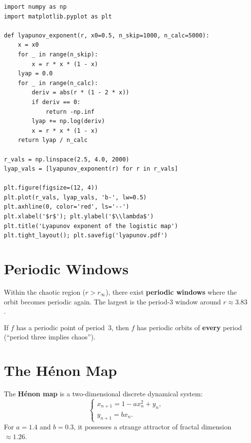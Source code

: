 \begin{codeblock}[title=\textbf{Computing the Lyapunov exponent}]
\begin{verbatim}
import numpy as np
import matplotlib.pyplot as plt

def lyapunov_exponent(r, x0=0.5, n_skip=1000, n_calc=5000):
    x = x0
    for _ in range(n_skip):
        x = r * x * (1 - x)
    lyap = 0.0
    for _ in range(n_calc):
        deriv = abs(r * (1 - 2 * x))
        if deriv == 0:
            return -np.inf
        lyap += np.log(deriv)
        x = r * x * (1 - x)
    return lyap / n_calc

r_vals = np.linspace(2.5, 4.0, 2000)
lyap_vals = [lyapunov_exponent(r) for r in r_vals]

plt.figure(figsize=(12, 4))
plt.plot(r_vals, lyap_vals, 'b-', lw=0.5)
plt.axhline(0, color='red', ls='--')
plt.xlabel('$r$'); plt.ylabel('$\\lambda$')
plt.title('Lyapunov exponent of the logistic map')
plt.tight_layout(); plt.savefig('lyapunov.pdf')
\end{verbatim}
\end{codeblock}

\section{Periodic Windows}

\begin{remark}
Within the chaotic region ($r>r_\infty$), there exist
\textbf{periodic windows} where the orbit becomes periodic again.
The largest is the period-$3$ window around $r\approx 3.83$.
\end{remark}

\begin{theorem}[Li--Yorke, 1975]
If $f$ has a periodic point of period~$3$, then $f$ has periodic
orbits of \textbf{every} period (``period three implies chaos'').
\end{theorem}

\section{The H\'enon Map}
\label{sec:henon}

\begin{definition}
The \textbf{H\'enon map} is a two-dimensional discrete dynamical
system:
\[
  \begin{cases}
    x_{n+1} = 1 - ax_n^2 + y_n, \\
    y_{n+1} = bx_n.
  \end{cases}
\]
For $a=1.4$ and $b=0.3$, it possesses a strange attractor of fractal
dimension $\approx 1.26$.
\end{definition}

